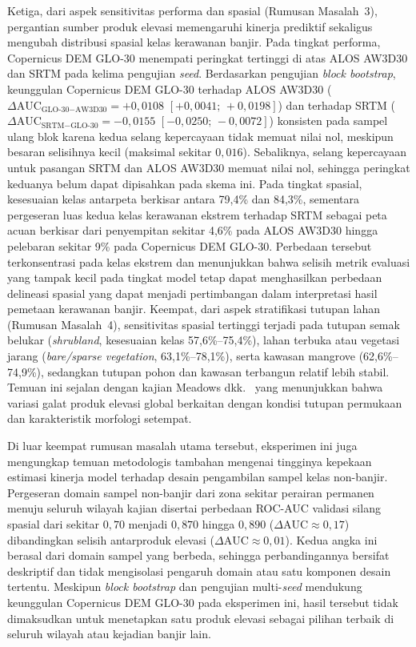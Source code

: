 \documentclass[12pt,a4paper]{article}
\begin{document}
Ketiga, dari aspek sensitivitas performa dan spasial (Rumusan Masalah~3),
pergantian sumber produk elevasi memengaruhi kinerja prediktif
sekaligus mengubah distribusi spasial kelas kerawanan banjir. Pada tingkat
performa, Copernicus DEM GLO-30 menempati peringkat tertinggi di atas ALOS
AW3D30 dan SRTM pada kelima pengujian \textit{seed}. Berdasarkan pengujian
\textit{block bootstrap}, keunggulan Copernicus DEM GLO-30 terhadap ALOS
AW3D30 ($\Delta\text{AUC}_{\text{GLO-30}-\text{AW3D30}} = +0{,}0108$
$[+0{,}0041;\,+0{,}0198]$) dan terhadap SRTM
($\Delta\text{AUC}_{\text{SRTM}-\text{GLO-30}} = -0{,}0155$
$[-0{,}0250;\,-0{,}0072]$) konsisten pada sampel ulang blok karena kedua
selang kepercayaan tidak memuat nilai nol, meskipun besaran selisihnya kecil
(maksimal sekitar $0{,}016$). Sebaliknya, selang kepercayaan untuk pasangan
SRTM dan ALOS AW3D30 memuat nilai nol, sehingga peringkat keduanya belum
dapat dipisahkan pada skema ini. Pada tingkat spasial, kesesuaian kelas
antarpeta berkisar antara 79,4\% dan 84,3\%, sementara pergeseran luas kedua
kelas kerawanan ekstrem terhadap SRTM sebagai peta acuan berkisar dari
penyempitan sekitar 4,6\% pada ALOS AW3D30 hingga pelebaran sekitar 9\%
pada Copernicus DEM GLO-30. Perbedaan tersebut terkonsentrasi pada kelas ekstrem dan
menunjukkan bahwa selisih metrik evaluasi yang tampak kecil pada tingkat
model tetap dapat menghasilkan perbedaan delineasi spasial yang dapat
menjadi pertimbangan dalam interpretasi hasil pemetaan kerawanan banjir.
Keempat, dari aspek stratifikasi tutupan lahan
(Rumusan Masalah~4), sensitivitas spasial tertinggi terjadi pada tutupan
semak belukar (\textit{shrubland}, kesesuaian kelas 57,6\%--75,4\%), lahan
terbuka atau vegetasi jarang (\textit{bare/sparse vegetation},
63,1\%--78,1\%), serta kawasan mangrove (62,6\%--74,9\%), sedangkan tutupan
pohon dan kawasan terbangun relatif lebih stabil. Temuan ini sejalan dengan
kajian Meadows dkk.\ \citep{meadows2024} yang menunjukkan bahwa variasi
galat produk elevasi global berkaitan dengan kondisi tutupan permukaan dan
karakteristik morfologi setempat.

Di luar keempat rumusan masalah utama tersebut, eksperimen ini juga mengungkap
temuan metodologis tambahan mengenai tingginya kepekaan estimasi kinerja model
terhadap desain pengambilan sampel kelas non-banjir. Pergeseran
domain sampel non-banjir dari zona sekitar perairan permanen menuju seluruh
wilayah kajian disertai perbedaan ROC-AUC validasi silang spasial dari sekitar
$0{,}70$ menjadi $0{,}870$ hingga $0{,}890$ ($\Delta\text{AUC} \approx
0{,}17$) dibandingkan selisih antarproduk elevasi
($\Delta\text{AUC} \approx 0{,}01$). Kedua angka ini berasal dari domain
sampel yang berbeda, sehingga perbandingannya bersifat deskriptif dan tidak
mengisolasi pengaruh domain atau satu komponen desain tertentu. Meskipun
\textit{block bootstrap} dan pengujian multi-\textit{seed} mendukung keunggulan
Copernicus DEM GLO-30 pada eksperimen ini, hasil tersebut tidak dimaksudkan
untuk menetapkan satu produk elevasi sebagai pilihan terbaik di seluruh
wilayah atau kejadian banjir lain.
\end{document}
